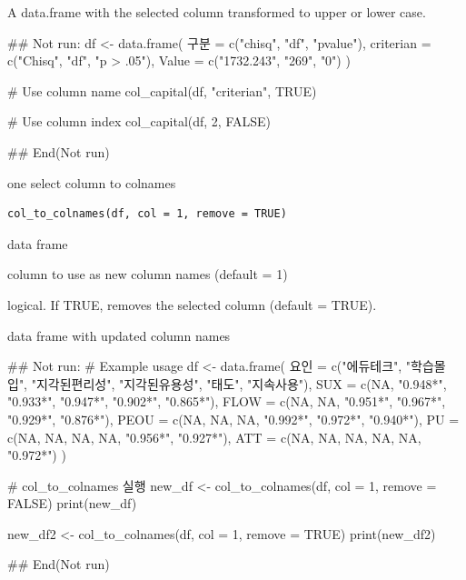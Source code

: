 \documentclass[a4paper]{book}
\begin{document}
%
\begin{Value}
A data.frame with the selected column transformed to upper or lower case.
\end{Value}
%
\begin{Examples}
\begin{ExampleCode}
## Not run: 
df <- data.frame(
  구분 = c("chisq", "df", "pvalue"),
  criterian = c("Chisq", "df", "p > .05"),
  Value = c("1732.243", "269", "0")
)

# Use column name
col_capital(df, "criterian", TRUE)

# Use column index
col_capital(df, 2, FALSE)

## End(Not run)
\end{ExampleCode}
\end{Examples}
%
\begin{Description}
one select column to colnames
\end{Description}
%
\begin{Usage}
\begin{verbatim}
col_to_colnames(df, col = 1, remove = TRUE)
\end{verbatim}
\end{Usage}
%
\begin{Arguments}
\begin{ldescription}
\item[\code{df}] data frame

\item[\code{col}] column to use as new column names (default = 1)

\item[\code{remove}] logical. If TRUE, removes the selected column (default = TRUE).
\end{ldescription}
\end{Arguments}
%
\begin{Value}
data frame with updated column names
\end{Value}
%
\begin{Examples}
\begin{ExampleCode}
## Not run: 
# Example usage
df <- data.frame(
  요인 = c("에듀테크", "학습몰입", "지각된편리성", "지각된유용성", "태도", "지속사용"),
  SUX = c(NA, "0.948*", "0.933*", "0.947*", "0.902*", "0.865*"),
  FLOW = c(NA, NA, "0.951*", "0.967*", "0.929*", "0.876*"),
  PEOU = c(NA, NA, NA, "0.992*", "0.972*", "0.940*"),
  PU = c(NA, NA, NA, NA, "0.956*", "0.927*"),
  ATT = c(NA, NA, NA, NA, NA, "0.972*")
)

# col_to_colnames 실행
new_df <- col_to_colnames(df, col = 1, remove = FALSE)
print(new_df)

new_df2 <- col_to_colnames(df, col = 1, remove = TRUE)
print(new_df2)

## End(Not run)

\end{ExampleCode}
\end{Examples}
\end{document}
